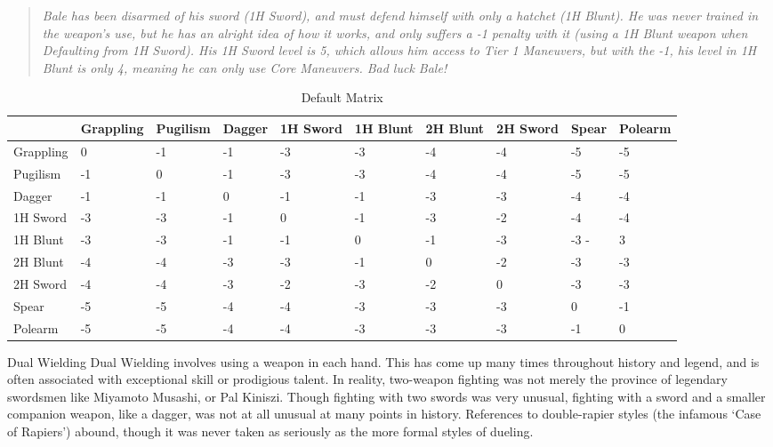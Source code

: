 \documentclass[oneside,11pt,english]{book}
\begin{document}
\begin{quote}
	\emph{Bale has been disarmed of his sword (1H Sword), and must defend himself with only a hatchet (1H Blunt). He was never trained in the weapon’s use, but he has an alright idea of how it works, and only suffers a -1 penalty with it (using a 1H Blunt weapon when Defaulting from 1H Sword). His 1H Sword level is 5, which allows him access to Tier 1 Maneuvers, but with the -1, his level in 1H Blunt is only 4, meaning he can only use Core Maneuvers. Bad luck Bale! }
\end{quote}

\begin{table}
	\centering
	\caption{Default Matrix}
	\label{tab:Default Matrix}
	\begin{tabu} spread 0pt {*{10}{X[-1,c]}}
&Grappling &Pugilism &Dagger &1H Sword &1H Blunt &2H Blunt &2H Sword &Spear &Polearm\\\toprule
Grappling &0 &-1 &-1 &-3 &-3 &-4 &-4 &-5 &-5\\
Pugilism &-1 &0 &-1 &-3 &-3 &-4 &-4 &-5 &-5\\
Dagger &-1 &-1 &0 &-1 &-1 &-3 &-3 &-4 &-4\\
1H Sword &-3 &-3 &-1 &0 &-1 &-3 &-2 &-4 &-4\\
1H Blunt &-3 &-3 &-1 &-1 &0 &-1 &-3 &-3 -&3\\
2H Blunt &-4 &-4 &-3 &-3 &-1 &0 &-2 &-3 &-3\\
2H Sword &-4 &-4 &-3 &-2 &-3 &-2 &0 &-3 &-3\\
Spear &-5 &-5 &-4 &-4 &-3 &-3 &-3 &0 &-1\\
Polearm &-5 &-5 &-4 &-4 &-3 &-3 &-3 &-1 &0\\
	\end{tabu}
\end{table}

Dual Wielding 
Dual Wielding involves using a weapon in each hand. This has come up many times throughout history 
and legend, and is often associated with exceptional skill or prodigious talent. In reality, two-weapon 
fighting was not merely the province of legendary swordsmen like Miyamoto Musashi, or Pal Kiniszi. 
Though fighting with two swords was very unusual, fighting with a sword and a smaller companion 
weapon, like a dagger, was not at all unusual at many points in history. References to double-rapier styles 
(the infamous ‘Case of Rapiers’) abound, though it was never taken as seriously as the more formal styles 
of dueling. 

 
\end{document}
